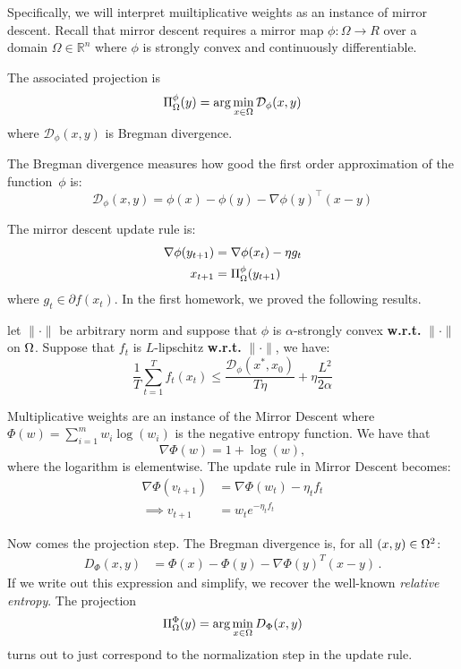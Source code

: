 Specifically, we will interpret muiltiplicative weights as an instance of mirror
descent.  Recall that mirror descent requires a mirror map $\phi : \Omega \to R$
over a domain $\Omega \in \mathbb{R}^n$ where $\phi$ is strongly convex and
continuously differentiable.

The associated projection is
\begin{equation*}
    \Pi^\phi_\Omega (y) = \arg\min_{x\in\Omega} \mathcal{D}_\phi(x,y)
\end{equation*}
where $\mathcal{D}_\phi(x,y)$ is Bregman divergence.
\begin{definition}
The Bregman divergence measures how good the first order approximation of the
function~$\phi$ is:
    \begin{equation*}
        \mathcal{D}_\phi(x,y) = \phi(x) - \phi(y) - \nabla \phi(y) ^\intercal (x-y)
    \end{equation*}
\end{definition}
The mirror descent update rule is:
\begin{align*}
    \nabla \phi(y_{t+1}) &= \nabla \phi (x_t) - \eta g_t \\
    x_{t+1} &=  \Pi^\phi_\Omega (y_{t+1})
\end{align*}
where $g_t \in \partial f(x_t).$ 
In the first homework, we proved the following results.
\begin{theorem}
    let $\|\cdot\|$ be arbitrary norm and suppose that $\phi$ is $\alpha$-strongly convex      \textbf{w.r.t.} $\|\cdot\|$ on $\Omega$. Suppose that $f_t$ is $L$-lipschitz \textbf{w.r.t.} $\|\cdot\|$, we have:
    \begin{equation*}
        \frac{1}{T}\sum^T_{t=1} f_t(x_t) \leq \frac{ \mathcal{D}_\phi(x^*,x_0)}{T \eta}+ \eta \frac{L^2}{2\alpha}
    \end{equation*}
\end{theorem}


Multiplicative weights are an instance of the Mirror Descent where $\Phi(w)=
\sum_{i=1}^m w_i \log(w_i)$ is the negative entropy function.
We have that
\[
\nabla\Phi(w) =  1 + \log(w),
\]
where the logarithm is elementwise.
The update rule in Mirror Descent becomes:
\begin{align*}
    \nabla\Phi(v_{t+1}) &=\nabla\Phi(w_{t}) - \eta_tf_t \\
    \implies v_{t+1} &= w_te^{-\eta_t f_t}
\end{align*}

Now comes the projection step. The Bregman divergence is, for all $(x,y)\in\Omega^2$:
\begin{align*}
    D_{\Phi}(x,y) &= \Phi(x)-\Phi(y) - \nabla\Phi(y)^T(x-y)\,.
\end{align*}
If we write out this expression and simplify, we recover the well-known
\emph{relative entropy}. The projection
\begin{align*}
    \Pi_{\Omega}^{\Phi}(y) = \arg\min_{x\in\Omega}D_{\Phi}(x,y)
\end{align*}
turns out to just correspond to the normalization step in the update rule.

